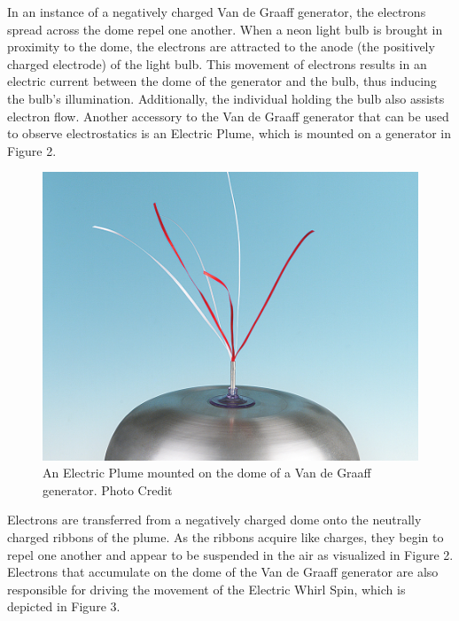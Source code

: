 \documentclass[12pt]{amsart}
\begin{document}
\indent In an instance of a negatively charged Van de Graaff generator, the electrons spread across the dome repel one another. When a neon light bulb is brought in proximity to the dome, the electrons are attracted to the anode (the positively charged electrode) of the light bulb\cite{scienceworld}. This movement of electrons results in an electric current between the dome of the generator and the bulb, thus inducing the bulb’s illumination. Additionally, the individual holding the bulb also assists electron flow. Another accessory to the Van de Graaff generator that can be used to observe electrostatics is an Electric Plume, which is mounted on a generator in Figure 2.\newpage
\begin{figure}[h]
	\includegraphics[width=\smallgraph,scale=0.01]{Plume.png}
	\caption{ An Electric Plume mounted on the dome of a Van de Graaff generator. Photo Credit \cite{Flinn}}
	\label{Plume}
\end{figure}

\indent Electrons are transferred from a negatively charged dome onto the neutrally charged ribbons of the plume. As the ribbons acquire like charges, they begin to repel one another and appear to be suspended in the air as visualized in Figure 2. Electrons that accumulate on the dome of the Van de Graaff generator are also responsible for driving the movement of the Electric Whirl Spin, which is depicted in Figure 3.\\
\end{document}
